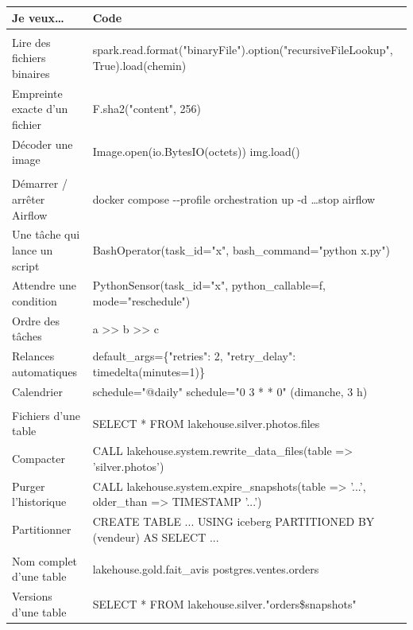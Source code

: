 \documentclass[11pt,a4paper]{article}
\begin{document}
\begin{center}
\small
\renewcommand{\arraystretch}{1.22}
\begin{tabularx}{\textwidth}{@{}>{\raggedright\arraybackslash}p{4.1cm} >{\raggedright\arraybackslash\ttfamily\footnotesize}X@{}}
\toprule
\normalfont\textbf{Je veux\dots} & \normalfont\textbf{Code} \\
\midrule
\multicolumn{2}{@{}l}{\textbf{\textcolor{lhblue}{Fichiers et images}}} \\
Lire des fichiers binaires & spark.read.format("binaryFile").option("recursiveFileLookup", True).load(chemin) \\
Empreinte exacte d'un fichier & F.sha2("content", 256) \\
Décoder une image & Image.open(io.BytesIO(octets)) \quad img.load() \\
\midrule
\multicolumn{2}{@{}l}{\textbf{\textcolor{lhblue}{Airflow}}} \\
Démarrer / arrêter Airflow & docker compose -{}-profile orchestration up -d \quad \dots stop airflow \\
Une tâche qui lance un script & BashOperator(task\_id="x", bash\_command="python x.py") \\
Attendre une condition & PythonSensor(task\_id="x", python\_callable=f, mode="reschedule") \\
Ordre des tâches & a >{}> b >{}> c \\
Relances automatiques & default\_args=\{"retries": 2, "retry\_delay": timedelta(minutes=1)\} \\
Calendrier & schedule="@daily" \quad schedule="0 3 * * 0" \textrm{(dimanche, 3 h)} \\
\midrule
\multicolumn{2}{@{}l}{\textbf{\textcolor{lhblue}{Iceberg}}} \\
Fichiers d'une table & SELECT * FROM lakehouse.silver.photos.files \\
Compacter & CALL lakehouse.system.rewrite\_data\_files(table => 'silver.photos') \\
Purger l'historique & CALL lakehouse.system.expire\_snapshots(table => '...', older\_than => TIMESTAMP '...') \\
Partitionner & CREATE TABLE ... USING iceberg PARTITIONED BY (vendeur) AS SELECT ... \\
\midrule
\multicolumn{2}{@{}l}{\textbf{\textcolor{lhblue}{Trino}}} \\
Nom complet d'une table & lakehouse.gold.fait\_avis \quad postgres.ventes.orders \\
Versions d'une table & SELECT * FROM lakehouse.silver."orders\$snapshots" \\

\end{tabularx}
\end{center}
\end{document}
